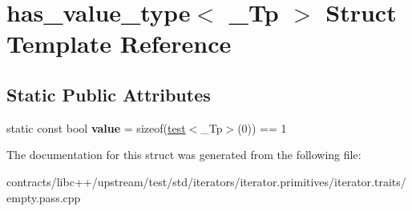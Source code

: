 \hypertarget{structhas__value__type}{}\section{has\+\_\+value\+\_\+type$<$ \+\_\+\+Tp $>$ Struct Template Reference}
\label{structhas__value__type}
\subsection*{Static Public Attributes}
\begin{DoxyCompactItemize}
\item 
\mbox{\label{structhas__value__type_a923a4f2f7b9179a610eddb735af032e8}} 
static const bool {\bfseries value} = sizeof(\mbox{\hyperlink{structtest}{test}}$<$\+\_\+\+Tp$>$(0)) == 1
\end{DoxyCompactItemize}


The documentation for this struct was generated from the following file\+:\begin{DoxyCompactItemize}
\item 
contracts/libc++/upstream/test/std/iterators/iterator.\+primitives/iterator.\+traits/empty.\+pass.\+cpp\end{DoxyCompactItemize}
